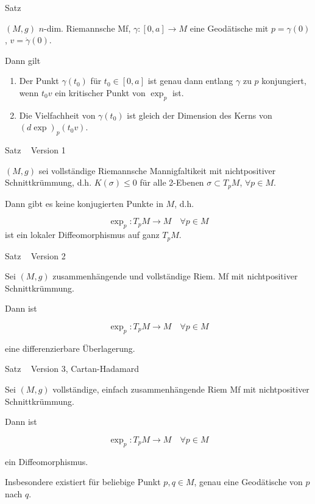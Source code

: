 \documentclass[a6paper,11pt,grid=front]{kartei}
\newcommand{\fl}[1]{\begin{flushleft}
 #1 \end{flushleft}}
\newcounter{def}
\newcounter{satz}
\newcommand{\defreset}{\setcounter{def}{1}}
\newcommand{\satzreset}{\setcounter{satz}{1}}
\newcommand{\thissatz}{\thesatz\ \stepcounter{satz}}
\begin{document}
\nonameyet
{Satz \thissatz} {}
{
\small
$(M,g)$ $n$-dim. Riemannsche Mf, $\gamma: [0,a] \to M$ eine Geodätische mit 
$p = \gamma(0)$, $v = \dot \gamma(0)$.
\fl{Dann gilt}
\begin{enumerate}[1.]
\item  Der Punkt $\gamma(t_0)$ für $t_0\in [0,a]$ ist genau dann entlang $\gamma$
zu $p$ konjungiert, wenn $t_0v$ ein kritischer Punkt von $\exp_p$ ist.
\item Die Vielfachheit von $\gamma(t_0)$ ist gleich der Dimension des 
Kerns von $(d\exp)_p(t_0v)$.
\end{enumerate}

}
{}

\defreset
\satzreset
{}

\nonameyet
{Satz \thissatz} {Version 1}
{
$(M,g)$ sei vollständige Riemannsche Mannigfaltikeit mit nichtpositiver
Schnittkrümmung, d.h. $K(\sigma) \leq 0$ für alle 2-Ebenen 
$\sigma \subset T_pM$, $\forall p\in M$.
\fl{Dann gibt es keine konjugierten Punkte in $M$, d.h.}
\[
\exp_p : T_pM \to M \quad \forall p\in M
\]
ist ein lokaler Diffeomorphismus auf ganz $T_pM$.
}
{}

\nonameyet
{Satz \thissatz} {Version 2}
{
Sei $(M,g)$ zusammenhängende und vollständige Riem. Mf mit nichtpositiver
Schnittkrümmung.
\fl{Dann ist }
\[
\exp_p : T_pM \to M \quad \forall p\in M
\]
\fl{eine differenzierbare Überlagerung.}
}
{}

\nonameyet
{Satz \thissatz} {Version 3, Cartan-Hadamard}
{
Sei $(M,g)$ vollständige, einfach zusammenhängende Riem Mf mit
nichtpositiver Schnittkrümmung.
\fl{Dann ist }
\[
\exp_p : T_pM \to M \quad \forall p\in M
\]
\fl{ein Diffeomorphismus.}
\fl{Insbesondere existiert für beliebige Punkt $p,q\in M$, genau eine 
Geodätische von $p$ nach $q$.}
}
{}

\defreset
\satzreset
{}
\end{document}
